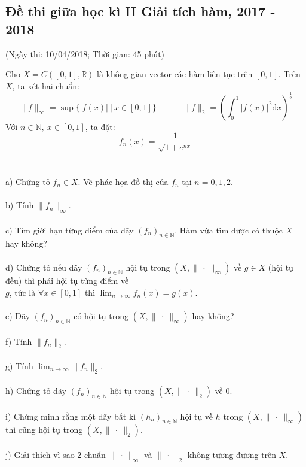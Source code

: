\documentclass[10pt, a4paper]{article}
\begin{document}
\subsection{Đề thi giữa học kì II Giải tích hàm, 2017 - 2018}
\begin{center}
	\color{blue}(Ngày thi: 10/04/2018; Thời gian: 45 phút)
\end{center}
Cho $X=C([0,1],\mathbb R)$ là không gian vector các hàm liên tục trên $[0,1]$. Trên $X$, ta xét hai chuẩn: $$\lVert f\rVert_\infty=\sup\{|f(x)|~|~x\in[0,1]\}~~~~~~~~~~~~~~\lVert f\rVert_2=\left(\displaystyle\int_0^1|f(x)|^2\text{d}x\right)^{\frac12}$$
Với $n\in\mathbb N,~x\in[0,1]$, ta đặt: $$f_n(x)=\dfrac{1}{\sqrt{1+e^{nx}}}$$\\\\
\color{red}a) \color{black}Chứng tỏ $f_n\in X$. Vẽ phác họa đồ thị của $f_n$ tại $n=0,1,2$.\\\\
\color{red}b) \color{black} Tính $\lVert f_n\rVert_\infty$.\\\\
\color{red}c) \color{black} Tìm giới hạn từng điểm của dãy $(f_n)_{n\in\mathbb{N}}$. Hàm vừa tìm được có thuộc $X$ hay không?\\\\
\color{red}d) \color{black} Chứng tỏ nếu dãy $(f_n)_{n\in\mathbb{N}}$ hội tụ trong $\left(X,\lVert~\cdot~\rVert_\infty\right)$ về $g\in X$ (hội tụ đều) thì phải hội tụ từng điểm về\\ $g$, tức là $\forall x\in[0,1]$ thì $\displaystyle\lim_{n\rightarrow\infty}f_n(x)=g(x)$.\\\\
\color{red}e) \color{black} Dãy $(f_n)_{n\in\mathbb{N}}$ có hội tụ trong $\left(X,\lVert~\cdot~\rVert_\infty\right)$ hay không?\\\\
\color{red}f) \color{black} Tính $\lVert f_n\rVert_2$.\\\\
\color{red}g) \color{black} Tính $\displaystyle\lim_{n\rightarrow\infty}\lVert f_n\rVert_2$.\\\\
\color{red}h) \color{black} Chứng tỏ dãy $(f_n)_{n\in\mathbb{N}}$ hội tụ trong $\left(X,\lVert~\cdot~\rVert_2\right)$ về 0.\\\\
\color{red}i) \color{black} Chứng minh rằng một dãy bất kì $(h_n)_{n\in\mathbb{N}}$ hội tụ về $h$ trong $\left(X,\lVert~\cdot~\rVert_\infty\right)$ thì cũng hội tụ trong $\left(X,\lVert~\cdot~\rVert_2\right)$.\\\\
\color{red}j) \color{black} Giải thích vì sao 2 chuẩn $\lVert~\cdot~\rVert_\infty$ và $\lVert~\cdot~\rVert_2$ không tương đương trên $X$.
\end{document}

